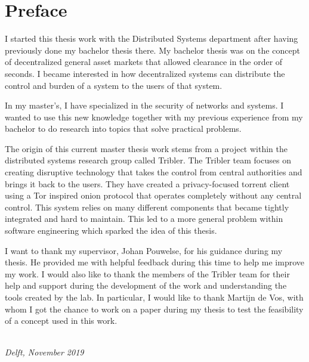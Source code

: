 \chapter*{Preface}

I started this thesis work with the Distributed Systems department after having previously done my bachelor thesis there. My bachelor thesis was on the concept of decentralized general asset markets that allowed clearance in the order of seconds. I became interested in how decentralized systems can distribute the control and burden of a system to the users of that system.

In my master's, I have specialized in the security of networks and systems. I wanted to use this new knowledge together with my previous experience from my bachelor to do research into topics that solve practical problems.

The origin of this current master thesis work stems from a project within the distributed systems research group called Tribler. The Tribler team focuses on creating disruptive technology that takes the control from central authorities and brings it back to the users. They have created a privacy-focused torrent client using a Tor inspired onion protocol that operates completely without any central control. This system relies on many different components that became tightly integrated and hard to maintain. This led to a more general problem within software engineering which sparked the idea of this thesis.

I want to thank my supervisor, Johan Pouwelse, for his guidance during my thesis. He provided me with helpful feedback during this time to help me improve my work. I would also like to thank the members of the Tribler team for their help and support during the development of the work and understanding the tools created by the lab. In particular, I would like to thank Martijn de Vos, with whom I got the chance to work on a paper during my thesis to test the feasibility of a concept used in this work.

\begin{flushright}
{\makeatletter\itshape
    \@author \\
    Delft, November 2019
\makeatother}
\end{flushright}

